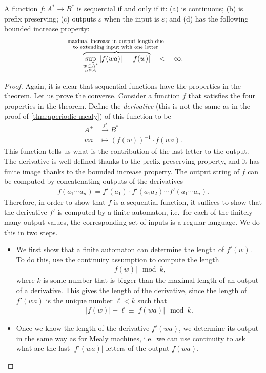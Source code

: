 \begin{theorem}\label{thm:sequential-function-independent}
    A function $f : A^* \to B^*$ is  sequential if and only if it: (a) is continuous; (b) is prefix preserving; (c) outputs $\varepsilon$ when the input is $\varepsilon$; and (d) has the following bounded increase property:
        \begin{align*}
        \myoverbrace{\sup_{\substack{w \in A^* \\ a \in A}} |f(wa)| - |f(w)|}{maximal increase in output length due \\ to extending input with  one letter} \quad < \quad \infty.
        \end{align*}
\end{theorem}
\begin{proof}
    Again, it is clear that sequential functions have the properties in the theorem. Let us prove the converse. Consider a function $f$ that satisfies the four properties in the theorem. Define the \emph{derivative} (this is not the same as in the proof of \cref{thm:aperiodic-mealy}) of this function to be 
\begin{align*}
     A^+ & \xrightarrow{f'} B^*  \\
     wa & \mapsto (f(w))^{-1} \cdot f(wa).
\end{align*}
This function tells us what is the contribution of the last letter to the output. The derivative is well-defined thanks to the prefix-preserving property, and it has finite image thanks to the bounded increase property. The output string of $f$ can be computed by concatenating outputs of the derivatives
\begin{align*}
f(a_1 \cdots a_n) = f'(a_1) \cdot f'(a_1 a_2) \cdots f'(a_1 \cdots a_n).
\end{align*}
Therefore, in order to show that $f$ is a sequential function, it suffices to show that the derivative $f'$ is computed by a finite automaton, i.e.~for each of the  finitely many output values, the corresponding set of inputs is a regular language. We do this in two steps.
\begin{itemize}
    \item  We first show that a finite automaton can determine the length of $f'(w)$. To do this, use the continuity assumption to compute the length
    \begin{align*}
    |f(w)| \mod k,
    \end{align*}
    where $k$ is some number that is bigger than the maximal length of an output of a derivative. This gives the length of the derivative, since the length of $f'(wa)$ is the unique number $\ell < k$ such that
\begin{align*}
    |f(w)| + \ell \equiv |f(wa)| \mod k.
\end{align*}
\item Once we know the length  of the derivative $f'(wa)$, we determine its output in the same way as for Mealy machines, i.e.~we can use continuity to ask what are the last $|f'(wa)|$ letters of the output $f(wa)$. 

\end{itemize}
\end{proof}

